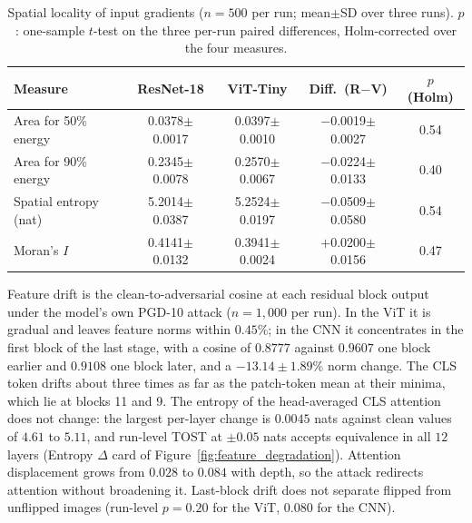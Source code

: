 \begin{table}[!t]
\centering
\caption{Spatial locality of input gradients ($n=500$ per run; mean$\pm$SD over three runs). $p$: one-sample $t$-test on the three per-run paired differences, Holm-corrected over the four measures.}
\label{tab:spatial}
\scriptsize
\setlength{\tabcolsep}{1.6pt}
\begin{tabular}{lcccc}
\toprule
\textbf{Measure} & \textbf{ResNet-18} & \textbf{ViT-Tiny} & \textbf{Diff.\ (R$-$V)} & \textbf{$p$ (Holm)} \\
\midrule
Area for 50\% energy & 0.0378$\pm$0.0017 & 0.0397$\pm$0.0010 & $-$0.0019$\pm$0.0027 & 0.54 \\
Area for 90\% energy & 0.2345$\pm$0.0078 & 0.2570$\pm$0.0067 & $-$0.0224$\pm$0.0133 & 0.40 \\
Spatial entropy (nat) & 5.2014$\pm$0.0387 & 5.2524$\pm$0.0197 & $-$0.0509$\pm$0.0580 & 0.54 \\
Moran's $I$ & 0.4141$\pm$0.0132 & 0.3941$\pm$0.0024 & $+$0.0200$\pm$0.0156 & 0.47 \\
\bottomrule
\end{tabular}
\end{table}

Feature drift is the clean-to-adversarial cosine at each residual block output under the model's own PGD-10 attack ($n = 1{,}000$ per run). In the ViT it is gradual and leaves feature norms within $0.45\%$; in the CNN it concentrates in the first block of the last stage, with a cosine of $0.8777$ against $0.9607$ one block earlier and $0.9108$ one block later, and a $-13.14\pm1.89\%$ norm change. The CLS token drifts about three times as far as the patch-token mean at their minima, which lie at blocks 11 and 9. The entropy of the head-averaged CLS attention does not change: the largest per-layer change is $0.0045$ nats against clean values of $4.61$ to $5.11$, and run-level TOST at $\pm0.05$ nats accepts equivalence in all $12$ layers (Entropy $\Delta$ card of Figure~\ref{fig:feature_degradation}). Attention displacement grows from $0.028$ to $0.084$ with depth, so the attack redirects attention without broadening it. Last-block drift does not separate flipped from unflipped images (run-level $p = 0.20$ for the ViT, $0.080$ for the CNN).

